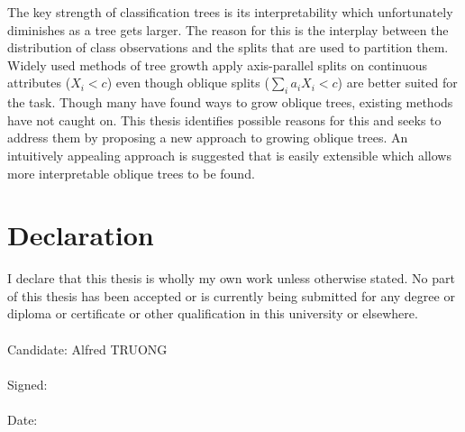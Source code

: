 \documentclass[12pt]{report}
\newenvironment{romanpages}{\cleardoublepage\setcounter{page}{1}\renewcommand{\thepage}{\roman{page}}}
{\cleardoublepage\renewcommand{\thepage}{\arabic{page}}\setcounter{page}{1}}
\begin{document}
The key strength of classification trees is its interpretability which unfortunately diminishes as a tree gets larger. The reason for this is the interplay between the distribution of class observations and the splits that are used to partition them. Widely used methods of tree growth apply axis-parallel splits on continuous attributes ($X_i<c$) even though oblique splits ($\sum_i a_iX_i<c$) are better suited for the task. Though many have found ways to grow oblique trees, existing methods have not caught on. This thesis identifies possible reasons for this and seeks to address them by proposing a new approach to growing oblique trees. An intuitively appealing approach is suggested that is easily extensible which allows more interpretable oblique trees to be found. 

\pagebreak
\thispagestyle{empty}
\vspace*{7cm}
\section*{Declaration}
I declare that this thesis is wholly my own work unless otherwise stated. No part of this thesis has been accepted or is currently being submitted for any degree or diploma or certificate or other qualification in this university or elsewhere.\\\\
Candidate: Alfred TRUONG\\\\
Signed:\\\\
Date:\\\\


\begin{romanpages}
\doublespacing
\tableofcontents
\end{romanpages}	

\fancyhead[RO,LE]{\thepage}
\fancyhead[LO]{\nouppercase{\rightmark}}
\fancyhead[RE]{\nouppercase{\leftmark}}
\pagestyle{fancy}

\doublespacing







\singlespacing

\pagestyle{plain}



\end{document}
